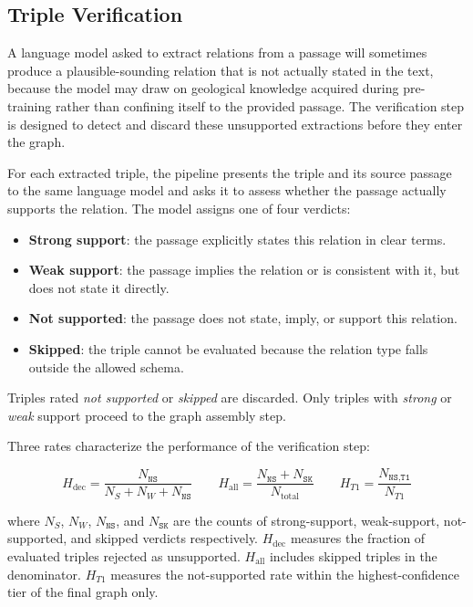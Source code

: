 \documentclass[10pt]{article}
\begin{document}
\subsection{Triple Verification}
\label{sec:verification}

A language model asked to extract relations from a passage
will sometimes produce a plausible-sounding relation that is
not actually stated in the text, because the model may draw
on geological knowledge acquired during pre-training rather
than confining itself to the provided passage.
The verification step is designed to detect and discard
these unsupported extractions before they enter the graph.

For each extracted triple, the pipeline presents the triple
and its source passage to the same language model and asks
it to assess whether the passage actually supports the
relation.
The model assigns one of four verdicts:

\begin{itemize}
  \item \textbf{Strong support}: the passage explicitly
  states this relation in clear terms.
  \item \textbf{Weak support}: the passage implies the
  relation or is consistent with it, but does not state
  it directly.
  \item \textbf{Not supported}: the passage does not state,
  imply, or support this relation.
  \item \textbf{Skipped}: the triple cannot be evaluated
  because the relation type falls outside the allowed
  schema.
\end{itemize}

Triples rated \emph{not supported} or \emph{skipped} are
discarded.
Only triples with \emph{strong} or \emph{weak} support
proceed to the graph assembly step.

Three rates characterize the performance of the verification
step:

\begin{equation}
H_{\text{dec}} =
  \frac{N_{\texttt{NS}}}{N_S + N_W + N_{\texttt{NS}}}
\qquad
H_{\text{all}} =
  \frac{N_{\texttt{NS}} + N_{\texttt{SK}}}{N_{\text{total}}}
\qquad
H_{T1} =
  \frac{N_{\texttt{NS,T1}}}{N_{T1}}
\label{eq:halluc_three}
\end{equation}

\noindent where $N_S$, $N_W$, $N_{\texttt{NS}}$, and
$N_{\texttt{SK}}$ are the counts of strong-support,
weak-support, not-supported, and skipped verdicts
respectively.
$H_{\text{dec}}$ measures the fraction of evaluated triples
rejected as unsupported.
$H_{\text{all}}$ includes skipped triples in the
denominator.
$H_{T1}$ measures the not-supported rate within the
highest-confidence tier of the final graph only.
\end{document}
